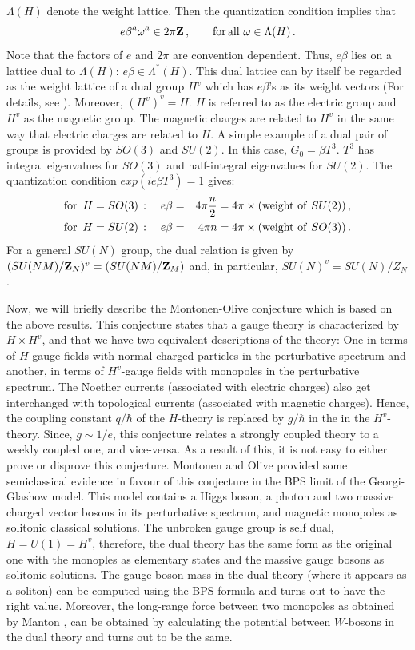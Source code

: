 $\Lambda(H)$ denote the weight lattice. Then the quantization
condition implies that
$$
e \beta^a \omega^a \in 2\pi{\bf Z}\,,\qquad {\rm for\, all}\,\, 
\omega\in \Lambda(H)\,.
$$      
Note that the factors of $e$ and $2\pi$ are convention dependent.  
Thus, $e\beta$ lies on a lattice dual to $\Lambda(H)$: $e\beta \in
\Lambda^*(H)$. This dual lattice can by itself be regarded as the
weight lattice of a dual group $H^v$ which has $e\beta$'s as its
weight vectors (For details, see \cite{GNO}). Moreover, $(H^v)^v=H$.
$H$ is referred to as the electric group and $H^v$ as the magnetic
group. The magnetic charges are related to $H^v$ in the same way that
electric charges are related to $H$. A simple example of a dual pair
of groups is provided by $SO(3)$ and $SU(2)$. In this case, $G_0=\beta
T^3$. $T^3$ has integral eigenvalues for $SO(3)$ and half-integral
eigenvalues for $SU(2)$. The quantization condition $exp(ie\beta
T^3)=1$ gives:  
\begin{eqnarray}
{\rm for}\,\,\,H=SO(3)\,:\quad e\beta &=& 4\pi \frac{n}{2}=4\pi \times 
({\rm weight \,\,of\,\,} SU(2))\,, \nonumber\\ 
{\rm for}\,\,\,H=SU(2)\,:\quad e\beta &=& 4\pi n = 4\pi \times 
({\rm weight\,\,of\,\,}SO(3))\,. \nonumber
\end{eqnarray}
For a general $SU(N)$ group, the dual relation is given by 
$(SU(NM)/{\bf Z}_N)^v = (SU(NM)/{\bf Z}_M)$ and, in particular,
$SU(N)^v = SU(N)/Z_N$.

Now, we will briefly describe the Montonen-Olive conjecture \cite{MO}
which is based on the above results. This  conjecture states that a
gauge theory is characterized by $H \times H^{v}$, and that we have
two equivalent descriptions of the theory: One in terms of $H$-gauge
fields with normal charged particles in the perturbative spectrum and
another, in terms of $H^{v}$-gauge fields with monopoles in the
perturbative spectrum. The Noether currents (associated with electric
charges) also get interchanged with topological currents (associated
with magnetic charges). Hence, the coupling constant $q/\hbar$ of the
$H$-theory is replaced by $g/\hbar$ in the in the $H^v$-theory. Since,
$g\sim 1/e$, this conjecture relates a strongly coupled theory to a
weekly coupled one, and vice-versa. As a result of this, it is
not easy to either prove or disprove this conjecture. Montonen and
Olive provided some semiclassical evidence in favour of this
conjecture in the BPS limit of the Georgi-Glashow model. This model
contains a Higgs boson, a photon and two massive charged vector bosons
in its perturbative spectrum, and magnetic monopoles as solitonic
classical solutions. The unbroken gauge group is self dual,
$H=U(1)=H^v$, therefore, the dual theory has the same form as the
original one with the monoples as elementary states and the massive
gauge bosons as solitonic solutions. The gauge boson mass in the dual
theory (where it appears as a soliton) can be computed using the BPS
formula and turns out to have the right value. Moreover, the
long-range force between two monopoles as obtained by Manton
\cite{manton}, can be obtained by calculating the potential between
$W$-bosons in the dual theory and turns out to be the same. 

